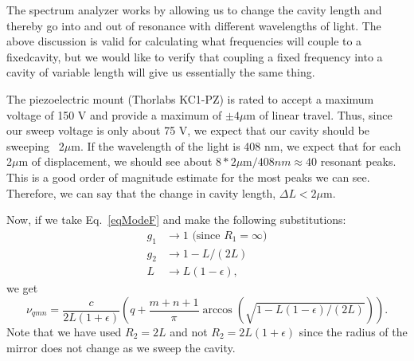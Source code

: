 The spectrum analyzer works by allowing us to change the cavity length and thereby go into and out of resonance with different wavelengths of light. The above discussion is valid for calculating what frequencies will couple to a fixedcavity, but we would like to verify that coupling a fixed frequency into a cavity of variable length will give us essentially the same thing.


The piezoelectric mount (Thorlabs KC1-PZ) is rated to accept a maximum voltage of 150 V and provide a maximum of $\pm4\mu$m of linear travel. Thus, since our sweep voltage is only about 75 V, we expect that our cavity should be sweeping ~2$\mu$m. If the wavelength of the light is 408 nm, we expect that for each 2$\mu$m of displacement, we should see about $8*2\mu$m$/408nm \approx 40$ resonant peaks. This is a good order of magnitude estimate for the most peaks we can see. Therefore, we can say that the change in cavity length, $\Delta L< 2\mu$m.

Now, if we take Eq.\ \ref{eqModeF} and make the following substitutions:
\begin{align}
g_1&\rightarrow1 \text{ (since $R_1=\infty$)} \\
g_2&\rightarrow 1-L/(2L)\\
L&\rightarrow L(1-\epsilon),
\end{align}
we get 
\begin{equation} \label{eqModeF_ready_for_expansion}
\nu_{qmn}=\frac{c}{2L(1+\epsilon)}\left(q+\frac{m+n+1}{\pi}\arccos(\sqrt{1-L(1-\epsilon)/(2L)})\right).
\end{equation}
Note that we have used $R_2=2L$ and not $R_2=2L(1+\epsilon)$ since the radius of the mirror does not change as we sweep the cavity. 

